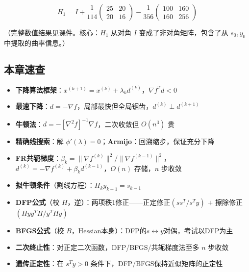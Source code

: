 {\[
H_1 = I + \frac{1}{114}\begin{pmatrix} 25 & 20 \\ 20 & 16 \end{pmatrix}
          - \frac{1}{356}\begin{pmatrix} 100 & 160 \\ 160 & 256 \end{pmatrix}
\]

（完整数值结果见课件。核心：$H_1$ 从对角 $I$ 变成了非对角矩阵，包含了从 $s_0,y_0$ 中提取的曲率信息。）}


\newpage
\clearpage\subsection{本章速查}

\begin{itemize}
  \item \textbf{下降算法框架}：$x^{(k+1)} = x^{(k)} + \lambda_k d^{(k)}$，$\nabla f^T d < 0$
  \item \textbf{最速下降}：$d = -\nabla f$，局部最快但全局锯齿，$d^{(k)} \perp d^{(k+1)}$
  \item \textbf{牛顿法}：$d = -[\nabla^2 f]^{-1}\nabla f$，二次收敛但 $O(n^3)$ 贵
  \item \textbf{精确线搜索}：解 $\phi'(\lambda)=0$；\textbf{Armijo}：回溯缩步，保证充分下降
  \item \textbf{FR共轭梯度}：$\beta_k = \|\nabla f^{(k)}\|^2 / \|\nabla f^{(k-1)}\|^2$，$d^{(k)} = -\nabla f^{(k)} + \beta_k d^{(k-1)}$，$O(n)$ 存储，$n$ 步收敛
  \item \textbf{拟牛顿条件}（割线方程）：$H_k y_{k-1} = s_{k-1}$
  \item \textbf{DFP公式}（校 $H$，逆）：两项秩1修正——正定修正$(ss^T/s^Ty)$ $+$ 擦除修正$(Hyy^TH/y^THy)$
  \item \textbf{BFGS公式}（校 $B$，Hessian本身）：DFP的$s\leftrightarrow y$对偶，考试以DFP为主
  \item \textbf{二次终止性}：对正定二次函数，DFP/BFGS/共轭梯度法至多 $n$ 步收敛
  \item \textbf{遗传正定性}：在 $s^Ty > 0$ 条件下，DFP/BFGS保持近似矩阵的正定性
\end{itemize}

\endinput
